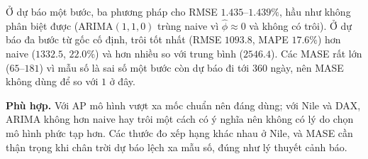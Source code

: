  Ở dự báo một bước, ba phương pháp cho RMSE $1.435$--$1.439\%$, hầu như không phân biệt được (ARIMA$(1,1,0)$ trùng naive vì $\hat\phi\approx0$ và không có trôi). Ở dự báo đa bước từ gốc cố định, trôi tốt nhất (RMSE $1093.8$, MAPE $17.6\%$) hơn naive ($1332.5$, $22.0\%$) và hơn nhiều so với trung bình ($2546.4$). Các MASE rất lớn ($65$--$181$) vì mẫu số là sai số một bước còn dự báo đi tới $360$ ngày, nên MASE không dùng để so với $1$ ở đây.

 \textbf{Phù hợp.} Với AP mô hình vượt xa mốc chuẩn nên đáng dùng; với Nile và DAX, ARIMA không hơn naive hay trôi một cách có ý nghĩa nên không có lý do chọn mô hình phức tạp hơn. Các thước đo xếp hạng khác nhau ở Nile, và MASE cần thận trọng khi chân trời dự báo lệch xa mẫu số, đúng như lý thuyết cảnh báo.

